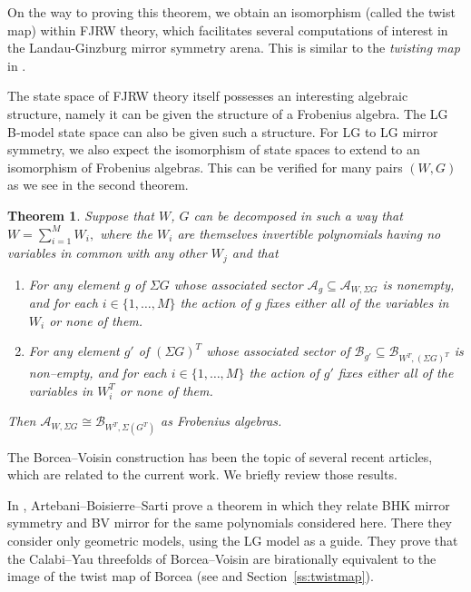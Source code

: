\documentclass[10pt, letterpaper]{amsart}
\newtheorem{thm}{Theorem}%
\theoremstyle{remark}
\newcommand{\sA}{\mathscr{A}}
\newcommand{\sB}{\mathscr{B}}
\newcommand{\s}[1]{\Sigma #1}
\newcommand{\amanda}[1]{\todo[color=red(munsell),fancyline]{Am:#1}}
\newcommand{\nathan}[1]{\todo[color=pistachio,fancyline]{N:#1}}
\begin{document}
On the way to proving this theorem, we obtain an isomorphism (called the twist map) within FJRW theory, which facilitates several computations of interest in the Landau-Ginzburg mirror symmetry arena. This is similar to the \textit{twisting map} in \cite{GLY}.  %

The state space of FJRW theory itself possesses an interesting algebraic structure, namely it can be given the structure of a Frobenius algebra. The LG B-model state space can also be given such a structure. For LG to LG mirror symmetry, we also expect the isomorphism of state spaces to extend to an isomorphism of Frobenius algebras. This can be verified for many pairs $(W,G)$ as we see in the second theorem. 

\begin{thm}\label{t:Algiso}
Suppose that  $W$, $G$  can be decomposed in such a way that 
 $   W = \sum_{i=1}^{M} W_i ,$
where the $W_i$ are themselves invertible polynomials having no variables in common with any other $W_j$ and that 
\begin{enumerate}
\item For any element $g$ of $\s{G}$ whose associated sector  $\sA_g \subseteq \sA_{W,\s{G}}$ is nonempty, and for each $i\in \{1,\dots ,M\}$ the action of $g$ fixes either all of the variables in $W_i$ or none of them. 
\item For any element $g'$ of $(\s{G})^T$ whose associated sector of $\sB_{g'} \subseteq \sB_{W^T,(\s{G})^T}$ is non--empty, and for each $i\in \{1,\dots ,M\}$ the action of $g'$ fixes either all of the variables in $W_i^T$ or none of them.
\end{enumerate}
Then $\sA_{W, \s{G}} \cong \sB_{W^T, \s (G^T)}$ as Frobenius algebras.
\end{thm}

The Borcea--Voisin construction has been the topic of several recent articles, which are related to the current work. We briefly review those results.  

In \cite{ABS}, Artebani--Boisierre--Sarti prove a theorem in which they relate BHK mirror symmetry and BV mirror for the same polynomials considered here. There they consider only geometric models, using the LG model as a guide. They prove that the Calabi--Yau threefolds of Borcea--Voisin are birationally equivalent to the image of the twist map of Borcea (see \cite{Borcea} and Section~\ref{ss:twistmap}). 
\end{document}
